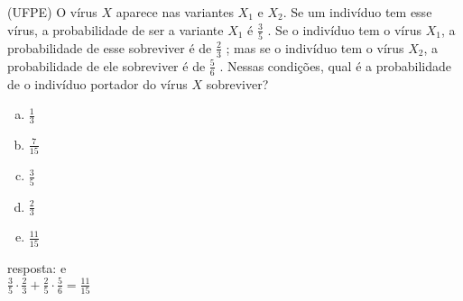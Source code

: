 \begin{ex}
(UFPE) O vírus $X$ aparece nas variantes $X_1$ e $X_2$. Se um indivíduo tem esse vírus, a probabilidade de ser a variante  $X_1$ é $\frac{3}{5}$  . Se o indivíduo tem o vírus $X_1$, a probabilidade de esse sobreviver é de $\frac{2}{3}$ ; mas se o indivíduo tem o vírus $X_2$, a probabilidade de ele sobreviver é de $\frac{5}{6}$ . Nessas condições, qual é a probabilidade de o indivíduo portador do vírus $X$ sobreviver?
   \begin{enumerate}[(a)]
   \item $\frac{1}{3}$
   \item $\frac{7}{15}$
   \item $\frac{3}{5}$
   \item $\frac{2}{3}$
   \item $\frac{11}{15}$
   \end{enumerate}
     \begin{sol}
      resposta: e \\
      $\frac{3}{5}\cdot\frac{2}{3}+\frac{2}{5}\cdot\frac{5}{6}=\frac{11}{15}$
     \end{sol}
\end{ex}